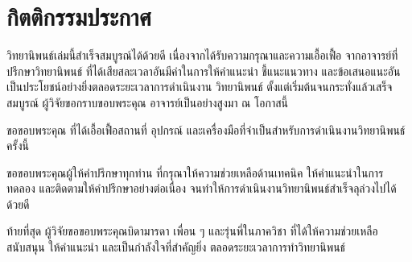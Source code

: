 \chapter*{กิตติกรรมประกาศ}

วิทยานิพนธ์เล่มนี้สำเร็จสมบูรณ์ได้ด้วยดี เนื่องจากได้รับความกรุณาและความเอื้อเฟื้อ
จากอาจารย์ที่ปรึกษาวิทยานิพนธ์ \advisor{} ที่ได้เสียสละเวลาอันมีค่าในการให้คำแนะนำ
ชี้แนะแนวทาง และข้อเสนอแนะอันเป็นประโยชน์อย่างยิ่งตลอดระยะเวลาการดำเนินงาน
วิทยานิพนธ์ ตั้งแต่เริ่มต้นจนกระทั่งแล้วเสร็จสมบูรณ์ ผู้วิจัยขอกราบขอบพระคุณ
อาจารย์เป็นอย่างสูงมา ณ โอกาสนี้

ขอขอบพระคุณ\faculty{} \university{}
ที่ได้เอื้อเฟื้อสถานที่ อุปกรณ์ และเครื่องมือที่จำเป็นสำหรับการดำเนินงานวิทยานิพนธ์ครั้งนี้

ขอขอบพระคุณผู้ให้คำปรึกษาทุกท่าน ที่กรุณาให้ความช่วยเหลือด้านเทคนิค
ให้คำแนะนำในการทดลอง และติดตามให้คำปรึกษาอย่างต่อเนื่อง
จนทำให้การดำเนินงานวิทยานิพนธ์สำเร็จลุล่วงไปได้ด้วยดี

ท้ายที่สุด ผู้วิจัยขอขอบพระคุณบิดามารดา เพื่อน ๆ และรุ่นพี่ในภาควิชา
ที่ได้ให้ความช่วยเหลือ สนับสนุน ให้คำแนะนำ และเป็นกำลังใจที่สำคัญยิ่ง
ตลอดระยะเวลาการทำวิทยานิพนธ์

\vspace{1.5cm}
\hfill \authorname
\newpage

